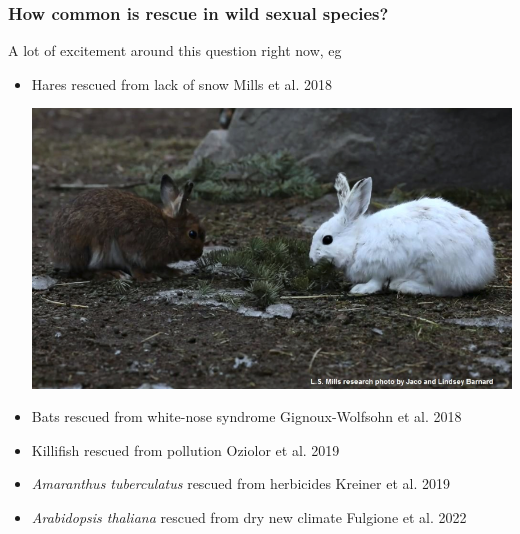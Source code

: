 \documentclass{beamer}
\begin{document}

%
%
%
%


\begin{frame}
	\frametitle{How common is rescue in wild sexual species?}

	A lot of excitement around this question right now, eg \pause

	\begin{itemize}
		\item Hares rescued from lack of snow {\tiny Mills et al. 2018}
		\begin{center}
			\includegraphics[width=0.5\linewidth]{../images/hares.png} \pause
		\end{center}
		\item Bats rescued from white-nose syndrome {\tiny Gignoux-Wolfsohn et al. 2018} \pause
		\item Killifish rescued from pollution {\tiny Oziolor et al. 2019} \pause
		\item \textit{Amaranthus tuberculatus} rescued from herbicides {\tiny Kreiner et al. 2019} \pause
		\item \textit{Arabidopsis thaliana} rescued from dry new climate {\tiny Fulgione et al. 2022}
	\end{itemize}

\end{frame}
\end{document}
